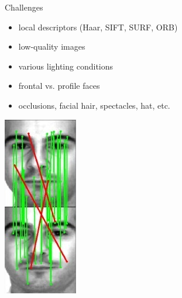 \begin{xpsectionbox}{Challenges}{}

\begin{minipage}{0.4\linewidth}
\begin{itemize}
	  \item local descriptors (Haar, SIFT, SURF, ORB)
	  \item low-quality images
	  \item various lighting conditions
	  \item frontal vs. profile faces
	  \item occlusions, facial hair, spectacles, hat, etc.
\end{itemize}
\end{minipage}
\begin{minipage}{0.6\linewidth}
\begin{center}
			\vspace{-2cm}
			\includegraphics[height=0.45\linewidth]{images/face_match_sift}
\end{center}
\end{minipage}

\end{xpsectionbox}


